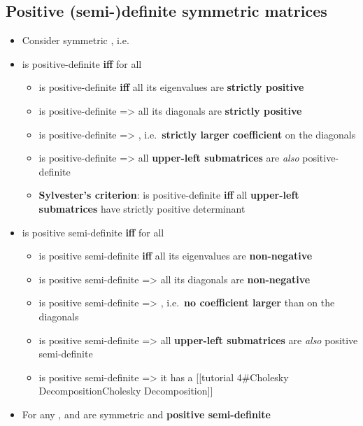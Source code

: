 
\subsection*{Positive (semi-)definite symmetric
matrices}

\begin{itemize}

\item
  Consider symmetric ,
  i.e.~
\item
   is positive-definite \textbf{iff}  for all

  \begin{itemize}
  
  \item
     is positive-definite \textbf{iff} all its eigenvalues are
    \textbf{strictly positive}
  \item
     is positive-definite =\textgreater{} all its diagonals are
    \textbf{strictly positive}
  \item
     is positive-definite =\textgreater{}
    , i.e.~\textbf{strictly
    larger coefficient} on the diagonals
  \item
     is positive-definite =\textgreater{} all
    \textbf{upper-left submatrices} are \emph{also} positive-definite
  \item
    \textbf{Sylvester's criterion}:  is positive-definite
    \textbf{iff} all \textbf{upper-left submatrices} have strictly
    positive determinant
  \end{itemize}
\item
   is positive semi-definite \textbf{iff} 
  for all 

  \begin{itemize}
  
  \item
     is positive semi-definite \textbf{iff} all its eigenvalues
    are \textbf{non-negative}
  \item
     is positive semi-definite =\textgreater{} all its
    diagonals are \textbf{non-negative}
  \item
     is positive semi-definite =\textgreater{}
    , i.e.~\textbf{no
    coefficient larger} than on the diagonals
  \item
     is positive semi-definite =\textgreater{} all
    \textbf{upper-left submatrices} are \emph{also} positive
    semi-definite
  \item
     is positive semi-definite =\textgreater{} it has a
    {[}{[}tutorial 4\#Cholesky Decomposition\textbar Cholesky
    Decomposition{]}{]}
  \end{itemize}
\item
  For any ,  and
   are symmetric and \textbf{positive semi-definite}
\end{itemize}

